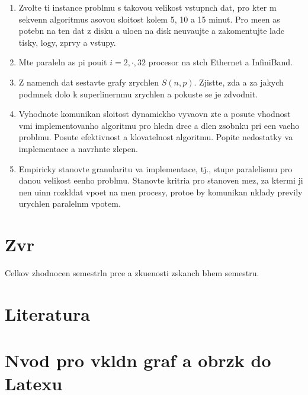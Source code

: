 \documentclass[12pt]{article}
\begin{document}
\begin{enumerate}
\item Zvolte ti instance problmu s takovou velikost vstupnch dat, pro kter m
sekvenn algoritmus asovou sloitost kolem 5, 10 a 15 minut. Pro
meen as potebn na ten dat z disku a uloen na disk
neuvaujte a zakomentujte ladc tisky, logy, zprvy a vstupy.
\item Mte paraleln as pi pouit $i=2,\cdot,32$ procesor na stch Ethernet a InfiniBand.
\item Z namench dat sestavte grafy zrychlen $S(n,p)$. Zjistte, zda a za jakych podmnek
dolo k superlinernmu zrychlen a pokuste se je zdvodnit.
\item Vyhodnote komunikan sloitost dynamickho vyvaovn zte a posute
vhodnost vmi implementovanho algoritmu pro hledn drce a dlen
zsobnku pri een vaeho problmu. Posute efektivnost a
klovatelnost algoritmu. Popite nedostatky va implementace a
navrhnte zlepen.
\item Empiricky stanovte
granularitu va implementace, tj., stupe paralelismu pro danou
velikost eenho problmu. Stanovte kritria pro stanoven mez, za
ktermi ji nen uinn rozkldat vpoet na men procesy, protoe
by komunikan nklady previly urychlen paralelnm vpotem.

\end{enumerate}

\section{Zvr}

Celkov zhodnocen semestrln prce a zkuenosti zskanch bhem
semestru.

\section{Literatura}

\appendix

\section{Nvod pro vkldn graf a obrzk do Latexu}
\end{document}
